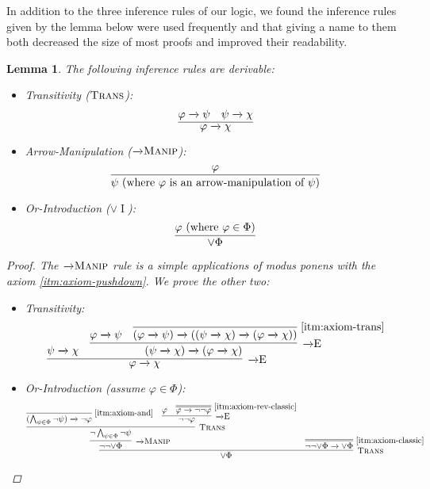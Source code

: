 \documentclass{amsart}
\newtheorem{lemma}[theorem]{Lemma}
\theoremstyle{definition}
\numberwithin{equation}{theorem}
\renewcommand{\phi}{\varphi}
\newcommand{\unvee}{{\vee}}
\newcommand{\narrow}[1]{\xrightarrow{#1}}
\renewcommand{\to}{\narrow{}}
\newcommand{\arr}{{\to}}
\newcommand{\intro}{\!\operatorname{I}}
\newcommand{\elim}{\!\operatorname{E}}
\newcommand{\trans}{\text{\sc{Trans}}}
\newcommand{\aref}[1]{\!\text{\ref{itm:axiom-#1}}}
\newcommand{\pushdown}{\arr\text{\sc{Manip}}}
\begin{document}
In addition to the three inference rules of our logic, we found the inference rules given by the lemma below were used frequently and that giving a name to them both decreased the size of most proofs and improved their readability.
\begin{lemma}\label{lem:inference-rules}
  The following inference rules are derivable:
  {\normalfont
  \begin{itemize}
  \item Transitivity ($\trans$):
    \[
      \infer{\phi\to\chi}{\phi\to\psi & \psi\to\chi}
    \]
  \item
    Arrow-Manipulation ($\pushdown$):
    \[
      \infer{\psi\text{ (where $\phi$ is an arrow-manipulation of $\psi$)}}{\phi}
    \]
  \item
    Or-Introduction ($\unvee\intro$):
    \[
      \infer{\unvee\Phi}{\phi\text{ (where $\phi\in\Phi$)}}
    \]
  \end{itemize}
  }
  \begin{proof}
  The $\pushdown$ rule is a simple applications of modus ponens with the axiom \ref{itm:axiom-pushdown}.
  We prove the other two:
    \begin{itemize}
    \item Transitivity:
      \[
	      \infer[\arr\elim]{\phi\to\chi}{
	        \psi\to\chi &
	        \infer[\arr\elim]{(\psi\to\chi)\to(\phi\to\chi)}{
	          \phi\to\psi &
	          \infer[\aref{trans}]{(\phi\to\psi)\to((\psi\to\chi)\to(\phi\to\chi))}{}
	        }
	      }
      \]
	  \item Or-Introduction (assume $\phi\in\Phi$):
	    \[
	      \infer[\trans]{\unvee\Phi}{
	        \infer[\pushdown]{\neg\neg\unvee\Phi}{
	          \infer[\trans]{\neg\bigwedge_{\psi\in\Phi}\neg\psi}{
	            \infer[\aref{and}]{(\bigwedge_{\psi\in\Phi}\neg\psi)\to\neg\phi}{} &
	            \infer[\arr\elim]{\neg\neg\phi}{
	              \phi &
	              \infer=[\aref{rev-classic}]{\phi\to\neg\neg\phi}{}
	            }
	          }
	        } &
	        \infer=[\aref{classic}]{\neg\neg\unvee\Phi\to\unvee\Phi}{}
	      }
	      \qedhere
	    \]
    \end{itemize}
  \end{proof}
\end{lemma}
\end{document}
